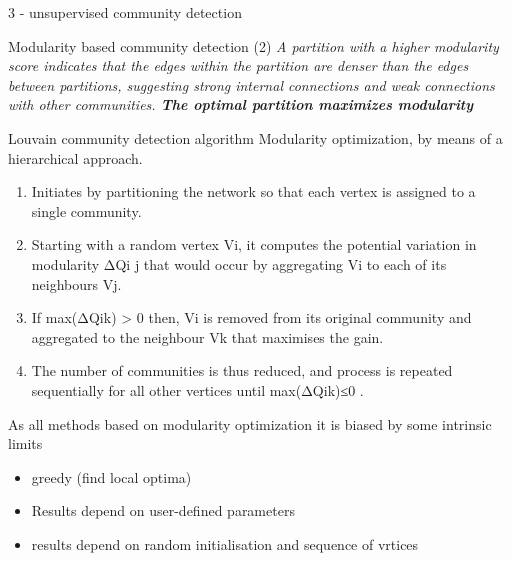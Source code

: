 \documentclass[
  ignorenonframetext,
]{beamer}
\begin{document}
\begin{frame}{3 - unsupervised community detection}
\begin{block}{Modularity based community detection (2)}
\emph{A partition with a higher modularity score indicates that the
edges within the partition are denser than the edges between partitions,
suggesting strong internal connections and weak connections with other
communities. \textbf{The optimal partition maximizes modularity}}
\end{block}

\begin{block}{Louvain community detection algorithm}
\protect\hypertarget{louvain-community-detection-algorithm}{}
Modularity optimization, by means of a hierarchical approach.

\begin{enumerate}
\item
  Initiates by partitioning the network so that each vertex is assigned
  to a single community.
\item
  Starting with a random vertex Vi, it computes the potential variation
  in modularity ΔQi j that would occur by aggregating Vi to each of its
  neighbours Vj.
\item
  If max(ΔQik) \textgreater{} 0 then, Vi is removed from its original
  community and aggregated to the neighbour Vk that maximises the gain.
\item
  The number of communities is thus reduced, and process is repeated
  sequentially for all other vertices until max(ΔQik)≤0 .
\end{enumerate}

As all methods based on modularity optimization it is biased by some
intrinsic limits

\begin{itemize}
\item
  greedy (find local optima)
\item
  Results depend on user-defined parameters
\item
  results depend on random initialisation and sequence of vrtices
\end{itemize}
\end{block}
\end{frame}
\end{document}
